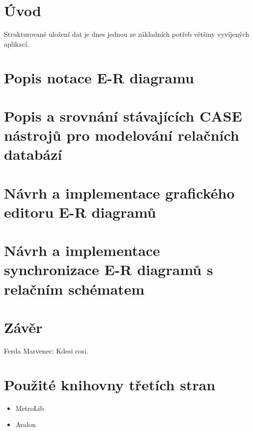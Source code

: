 \documentclass[czech,bachelor,public,dept460,male,twoside]{diploma}
\begin{document}
\MakeTitlePages

\lstlistoflistings

\section{Úvod}
Strukturované uložení dat je dnes jednou ze základních potřeb většiny vyvíjených aplikací. 


\section{Popis notace E-R diagramu}

\section{Popis a srovnání stávajících CASE nástrojů pro modelování relačních databází}

\section{Návrh a implementace grafického editoru E-R diagramů}

\section{Návrh a implementace synchronizace E-R diagramů s relačním schématem}

\section{Závěr}

\begin{thebibliography}{99}
	 Ferda Marvenec: Kdesi cosi.
\end{thebibliography}


\appendix
\section{Použité knihovny třetích stran}
\begin{itemize}
	\item MetroLib
	\item Avalon
\end{itemize}
\end{document}
